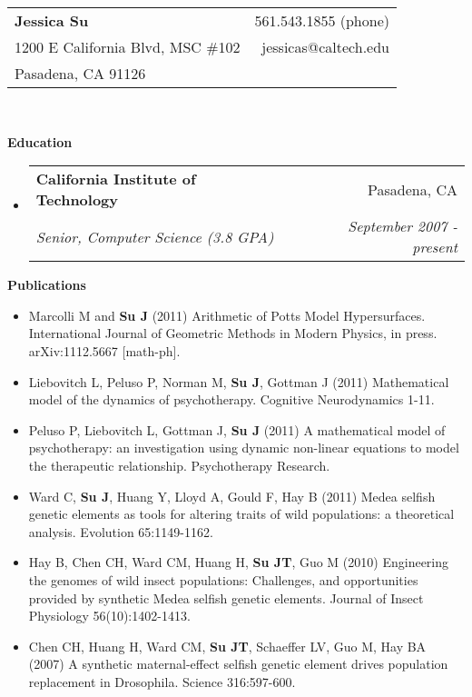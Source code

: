 \documentclass[letterpaper,11pt]{article}
\makeatletter
\newcommand{\resheading}[1]{{\large \colorbox{mygrey}{\begin{minipage}{\textwidth}{\textbf{#1 \vphantom{p\^{E}}}}\end{minipage}}}}
\newcommand{\ressubheading}[4]{
\begin{tabular*}{7.0in}{l@{\extracolsep{\fill}}r}
		\textbf{#1} & #2 \\
		\textit{#3} & \textit{#4} \\
\end{tabular*}\vspace{-6pt}}
\makeatother
\begin{document}
\begin{tabular*}{7.5in}{l@{\extracolsep{\fill}}r}
\textbf{\large Jessica Su}  & 561.543.1855 (phone)\\
1200 E California Blvd, MSC \#102 & jessicas@caltech.edu \\
Pasadena, CA 91126 & \\
\end{tabular*}
\\

\vspace{0.1in}

\resheading{Education}
\begin{itemize}
\item
	\ressubheading{California Institute of Technology}{Pasadena, CA}{Senior, Computer Science (3.8 GPA)}{September 2007 - present}

\end{itemize}

\resheading{Publications}
\begin{itemize}
	\item Marcolli M and \textbf{Su J} (2011) Arithmetic of Potts Model Hypersurfaces.  International Journal of Geometric Methods in Modern Physics, in press.  arXiv:1112.5667 [math-ph].
	\item Liebovitch L, Peluso P, Norman M, \textbf{Su J}, Gottman J (2011) Mathematical model of the dynamics of psychotherapy.  Cognitive Neurodynamics 1-11.
	\item Peluso P, Liebovitch L, Gottman J, \textbf{Su J} (2011) A mathematical model of psychotherapy: an investigation using dynamic non-linear equations to model the therapeutic relationship.  Psychotherapy Research.
	\item Ward C, \textbf{Su J}, Huang Y, Lloyd A, Gould F, Hay B (2011) Medea selfish genetic elements as tools for altering traits of wild populations: a theoretical analysis.  Evolution 65:1149-1162.
	\item Hay B, Chen CH, Ward CM, Huang H, \textbf{Su JT}, Guo M (2010) Engineering the genomes of wild insect populations: Challenges, and opportunities provided by synthetic Medea selfish genetic elements.  Journal of Insect Physiology 56(10):1402-1413.
	\item Chen CH, Huang H, Ward CM, \textbf{Su JT}, Schaeffer LV, Guo M, Hay BA (2007) A synthetic maternal-effect selfish genetic element drives population replacement in Drosophila. Science 316:597-600.
\end{itemize}
\end{document}
